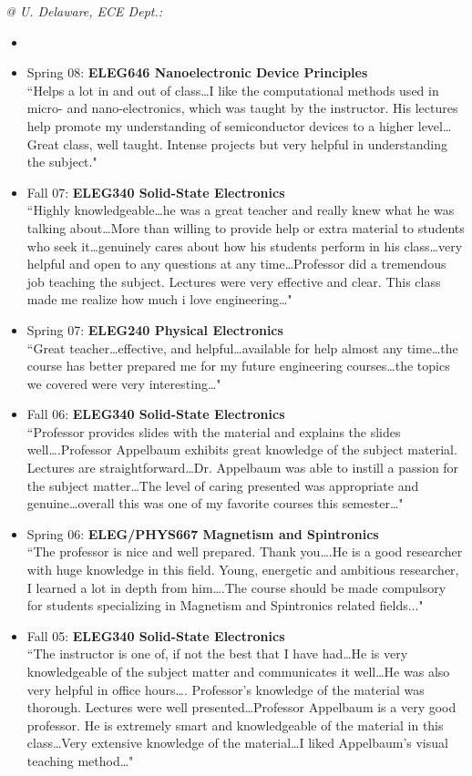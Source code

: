 \documentclass[paper=letter,fontsize=11pt]{scrartcl} %
\newcommand{\CourseEntry}[3]{
		\noindent \item{#1: \textbf{#2} \\ #3}}
\begin{document}
\vspace{6pt}
\noindent\textit{@ U. Delaware, ECE Dept.:}

\begin{itemize}
\item[]
\vspace{-24pt}
\CourseEntry{Spring 08}{ELEG646 Nanoelectronic Device Principles}
{``Helps a lot in and out of class\ldots I like the computational methods used in micro- and nano-electronics, which was taught by the instructor. His lectures help promote my understanding of semiconductor devices to a higher level\ldots  Great class, well taught. Intense projects but very helpful in understanding the subject."}

\CourseEntry{Fall 07}{ELEG340 Solid-State Electronics}
{``Highly knowledgeable\ldots he was a great teacher and really knew what he was talking about\ldots More than willing to provide help or extra material to students who seek it\ldots genuinely cares about how his students perform in his class\ldots very helpful and open to any questions at any time\ldots Professor did a tremendous job teaching the subject. Lectures were very effective and clear. This class made me realize how much i love engineering\ldots"}

\CourseEntry{Spring 07}{ELEG240 Physical Electronics} 
{``Great teacher\ldots effective, and helpful\ldots available for help almost any time\ldots the course has better prepared me for my future engineering courses\ldots the topics we covered were very interesting\ldots"}

\CourseEntry{Fall 06}{ELEG340 Solid-State Electronics}
{``Professor provides slides with the material and explains the slides well\ldots.Professor Appelbaum exhibits great knowledge of the subject material. Lectures are straightforward\ldots Dr. Appelbaum was able to instill a passion for the subject matter\ldots The level of caring presented was appropriate and genuine\ldots overall this was one of my favorite courses this semester\ldots"}

\CourseEntry{Spring 06}{ELEG/PHYS667 Magnetism and Spintronics}
{``The professor is nice and well prepared. Thank you\ldots.He is a good researcher with huge knowledge in this field. Young, energetic and ambitious researcher, I learned a lot in depth from him\ldots.The course should be made compulsory for students specializing in Magnetism and Spintronics related fields..."}

\CourseEntry{Fall 05}{ELEG340 Solid-State Electronics}
{``The instructor is one of, if not the best that I have had\ldots He is very knowledgeable of the subject matter and communicates it well\ldots He was also very helpful in office hours\ldots. Professor’s knowledge of the material was thorough. Lectures were well presented\ldots Professor Appelbaum is a very good professor. He is extremely smart and knowledgeable of the material in this class\ldots Very extensive knowledge of the material\ldots I liked Appelbaum's visual teaching method\ldots"}


\end{itemize}
\end{document}
